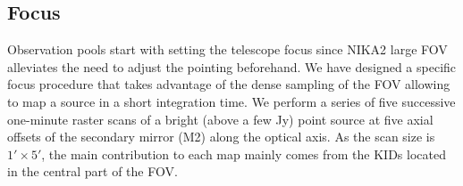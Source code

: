 
\subsection{Focus}
\label{se:axial_focus}

Observation pools start with setting the telescope focus since NIKA2 large
FOV alleviates the need to adjust the pointing beforehand.  
We have designed a specific focus procedure that takes
advantage of the dense sampling of the FOV allowing to map a source
in a short integration time. We perform a series of five successive one-minute
raster scans of a bright (above a few Jy) point source at five
axial offsets of the secondary mirror (M2) along the optical
axis. As the scan size is $1'\times 5'$, the main contribution to each
map mainly comes from the KIDs located in the central part of the FOV.%

